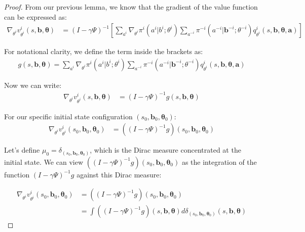 \begin{proof}
    From our previous lemma, we know that the gradient of the value function can be
    expressed as:
    \begin{align}
        \nabla_{\theta^i}v^{i}_{\theta^i}(s, \boldsymbol{b}, \boldsymbol{\theta}) & = (I - \gamma \Psi)^{-1}\left[\sum_{a^i}\nabla_{\theta^i}\pi^{i}(a^{i}|b^{i}; \theta^{i}) \sum_{a^{-i}}\pi^{-i}(a^{-i}|\boldsymbol{b}^{-i}; \theta^{-i}) q^{i}_{\theta^i}(s, \boldsymbol{b}, \boldsymbol{\theta}, \boldsymbol{a})\right]
    \end{align}

    For notational clarity, we define the term inside the brackets as:
    \begin{align}
        g(s, \boldsymbol{b}, \boldsymbol{\theta}) = \sum_{a^i}\nabla_{\theta^i}\pi^{i}(a^{i}|b^{i}; \theta^{i}) \sum_{a^{-i}}\pi^{-i}(a^{-i}|\boldsymbol{b}^{-i}; \theta^{-i}) q^{i}_{\theta^i}(s, \boldsymbol{b}, \boldsymbol{\theta}, \boldsymbol{a})
    \end{align}

    Now we can write:
    \begin{align}
        \nabla_{\theta^i}v^{i}_{\theta^i}(s, \boldsymbol{b}, \boldsymbol{\theta}) & = (I - \gamma \Psi)^{-1}g(s, \boldsymbol{b}, \boldsymbol{\theta})
    \end{align}

    For our specific initial state configuration
    $(s_{0}, \boldsymbol{b}_{0}, \boldsymbol{\theta}_{0})$:
    \begin{align}
        \nabla_{\theta^i}v^{i}_{\theta^i}(s_{0}, \boldsymbol{b}_{0}, \boldsymbol{\theta}_{0}) & = ((I - \gamma \Psi)^{-1}g)(s_{0}, \boldsymbol{b}_{0}, \boldsymbol{\theta}_{0})
    \end{align}

    Let's define
    $\mu_{0} = \delta_{(s_0, \boldsymbol{b}_0, \boldsymbol{\theta}_0)}$, which is the
    Dirac measure concentrated at the initial state. We can view
    $((I - \gamma \Psi)^{-1}g)(s_{0}, \boldsymbol{b}_{0}, \boldsymbol{\theta}_{0})$
    as the integration of the function $(I - \gamma \Psi)^{-1}g$ against this
    Dirac measure:

    \begin{align}
        \nabla_{\theta^i}v^{i}_{\theta^i}(s_{0}, \boldsymbol{b}_{0}, \boldsymbol{\theta}_{0}) & = ((I - \gamma \Psi)^{-1}g)(s_{0}, \boldsymbol{b}_{0}, \boldsymbol{\theta}_{0})                                                                                           \\
                                                                                              & = \int ((I - \gamma \Psi)^{-1}g)(s, \boldsymbol{b}, \boldsymbol{\theta}) d\delta_{(s_0, \boldsymbol{b}_0, \boldsymbol{\theta}_0)}(s, \boldsymbol{b}, \boldsymbol{\theta})
    \end{align}


\end{proof}
